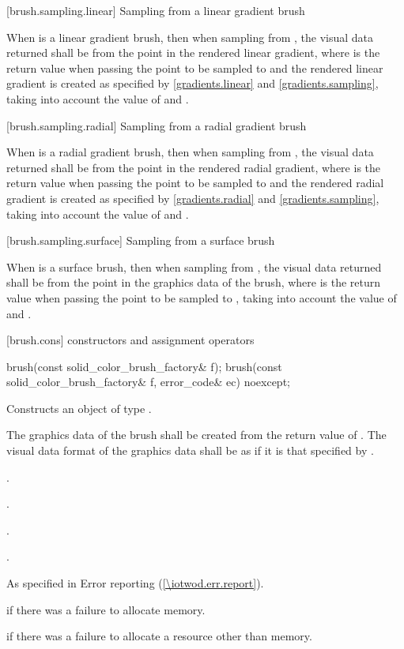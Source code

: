  [brush.sampling.linear] {Sampling from a linear gradient brush}

\pnum
When  is a linear gradient brush, then when sampling from , the visual data returned shall be from the point  in the rendered linear gradient, where  is the return value when passing the point to be sampled to  and the rendered linear gradient is created as specified by \ref{gradients.linear} and \ref{gradients.sampling}, taking into account the value of  and .

 [brush.sampling.radial] {Sampling from a radial gradient brush}

\pnum
When  is a radial gradient brush, then when sampling from , the visual data returned shall be from the point  in the rendered radial gradient, where  is the return value when passing the point to be sampled to  and the rendered radial gradient is created as specified by \ref{gradients.radial} and \ref{gradients.sampling}, taking into account the value of  and .

 [brush.sampling.surface] {Sampling from a surface brush}

\pnum
When  is a surface brush, then when sampling from , the visual data returned shall be from the point  in the graphics data of the brush, where  is the return value when passing the point to be sampled to , taking into account the value of  and .

 [brush.cons] { constructors and assignment operators}

\begin{itemdecl}
brush(const solid_color_brush_factory& f);
brush(const solid_color_brush_factory& f, error_code& ec) noexcept;
\end{itemdecl}
\begin{itemdescr}
\pnum
\effects
Constructs an object of type .

\pnum
The graphics data of the brush shall be created from the return value of . The visual data format of the graphics data shall be as if it is that specified by .

\pnum
\postconditions
{}.

.

.

.

\pnum
\throws
As specified in Error reporting (\ref{\iotwod.err.report}).

\pnum
\errors
{} if there was a failure to allocate memory.

 if there was a failure to allocate a resource other than memory.
\end{itemdescr}

